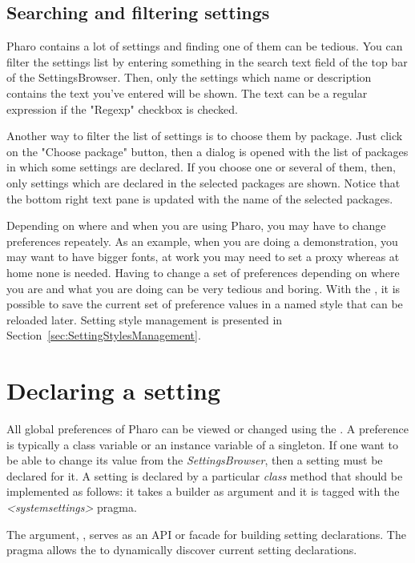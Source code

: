 \documentclass[a4paper,10pt,twoside]{book}
\begin{document}
\subsection{Searching and filtering settings}
Pharo contains a lot of settings and finding one of them can be tedious. 
You can filter the settings list by entering something in the search text field of the top bar of the SettingsBrowser. Then, only the settings which name or description contains the text you've entered will be shown. The text can be a regular expression if the "Regexp" checkbox is checked.

Another way to filter the list of settings is to choose them by package. Just click on the "Choose package" button, then a dialog is opened with the list of packages in which some settings are declared. If you choose one or several of them, then, only settings which are declared in the selected packages are shown. Notice that the bottom right text pane is updated with the name of the selected packages.

Depending on where and when you are using Pharo, you may have to change preferences repeately. As an example, when you are doing a demonstration, you may want to have bigger fonts, at work you may need to set a proxy whereas at home none is needed. Having to change a set of preferences depending on where you are and what you are doing can be very tedious and boring. With the \setbrowser, it is possible to save the current set of preference values in a named style that can be reloaded later. Setting style management is presented in Section~\ref{sec:SettingStylesManagement}.

\section{Declaring a setting}
\label{sec:DeclaringASetting}

All global preferences of Pharo can be viewed or changed using the \setbrowser. A preference is typically a class variable or an instance variable of a singleton. If one want to be able to change its value from the \textit{SettingsBrowser}, then a setting must be declared for it.
A setting is declared by a particular \emph{class} method that should be  implemented as follows: it takes a builder as argument and it is tagged with the \textit{<systemsettings>} pragma. 

The argument, , serves as an API or facade for building setting declarations. The pragma allows the \setbrowser to dynamically discover current setting declarations.
\end{document}
